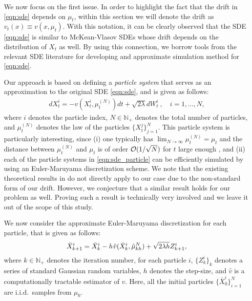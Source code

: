 We now focus on the first issue. In order to highlight the fact that the drift in \eqref{eqn:sde} depends on $\mu_t$, within this section we will denote the drift as $v_t(x) \equiv v(x, \mu_t)$. With this notation, it can be clearly observed that the SDE \eqref{eqn:sde} is similar to McKean-Vlasov SDEs \cite{veretennikov2006ergodic,mishura2016existence} whose drift depends on the distribution of $X_t$ as well. By using this connection, we borrow tools from the relevant SDE literature \cite{malrieu03,cgm-08} for developing and approximate simulation method for \eqref{eqn:sde}. 

Our approach is based on defining a \emph{particle system} that serves as an approximation to the original SDE \eqref{eqn:sde}, and is given as follows:
\begin{align}
d X_t^i = - v(X_t^i, \mu_t^{(N)}) dt + \sqrt{2 \lambda } d W_t^i \> , \quad i = 1,\dots, N, \label{eqn:sde_particle}
\end{align}
where $i$ denotes the particle index, $N \in \mathbb{N}_+$ denotes the total number of particles, and $\mu_t^{(N)}$ denotes the law of the particles $\{X_t^j\}_{j=1}^N$. This particle system is particularly interesting, since (i) one typically has $\lim_{N \rightarrow \infty} \mu_t^{(N)}= \mu_t $ and the distance between $\mu_t^{(N)}$ and $\mu_t$ is of order ${\cal O}(1/\sqrt{N})$ for $t$ large enough \cite{malrieu03,cgm-08}, and (ii) each of the particle systems in \eqref{eqn:sde_particle} can be efficiently simulated by using an Euler-Maruyama discretization scheme. We note that the existing theoretical results in \cite{veretennikov2006ergodic,mishura2016existence} do not directly apply to our case due to the non-standard form of our drift. However, we conjecture that a similar result holds for our problem as well. Proving such a result is technically very involved and we leave it out of the scope of this study. %

We now consider the approximate Euler-Maruyama discretization for each particle, that is given as follows:
\begin{align}
\bar{X}^i_{k+1} = \bar{X}^i_k - h \hspace{0.5pt} \hat{v}(\bar{X}^i_k, \hat{\mu}_{kh}^N ) + \sqrt{2 \lambda h} Z^i_{k+1},
\end{align}
where $k \in \mathbb{N}_+$ denotes the iteration number, for each particle $i$, $\{Z^i_k\}_{k}$ denotes a series of standard Gaussian random variables, $h$ denotes the step-size, and $\hat{v}$ is a computationally tractable estimator of $v$. Here, all the initial particles $\{\bar{X}_0^i\}_{i=1}^N$ are i.i.d.\ samples from $\mu_0$.

